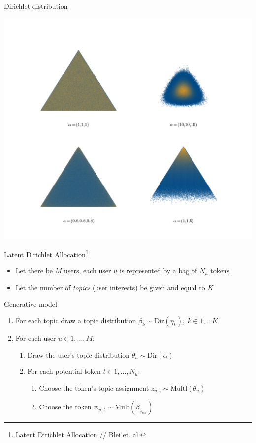 \documentclass[aspectratio=1610]{beamer}
\begin{document}
\begin{frame}{Dirichlet distribution}

\begin{center}
\includegraphics[scale=0.33]{images/dirichlet.png}
\end{center}

\end{frame}

\begin{frame}{Latent Dirichlet Allocation\footnote{Latent Dirichlet Allocation // Blei et. al.}}

\begin{itemize}
\item Let there be $M$ users, each user $u$ is represented by a bag of $N_u$ tokens
\item Let the number of {\it topics} (user interests) be given and equal to $K$
\end{itemize}

Generative model
\begin{enumerate}[I]
\item For each topic draw a topic distribution $\beta_k \sim \text{Dir}(\eta_k), \; k \in 1, \ldots K$
\item For each user $u \in 1, \ldots, M$:
\begin{enumerate}[1]
\item Draw the user's topic distribution $\theta_u \sim \text{Dir}(\alpha)$
\item For each potential token $t \in 1, \ldots, N_u$:
\begin{enumerate}[2.1]
\item Choose the token's topic assignment $z_{u, t} \sim \text{Multl}(\theta_u)$
\item Choose the token $w_{u, t} \sim \text{Mult}(\beta_{z_{u, t}})$
\end{enumerate}
\end{enumerate}
\end{enumerate}

\end{frame}
\end{document}
